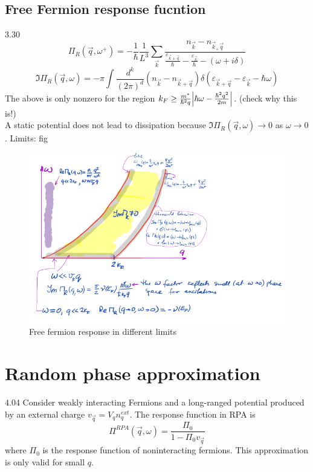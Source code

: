 \documentclass[10pt]{article}
\begin{document}
\subsection{Free Fermion response fucntion}
3.30
$$
\Pi_R(\vec q, \omega^+) = -\frac{1}{\hbar}\frac{1}{L^3}\sum_{\vec k}\frac{n_{\vec k}-n_{\vec k _+ \vec q}}{\frac{\varepsilon_{\vec k + \vec q}}{\hbar}-\frac{\varepsilon_{\vec k}}{\hbar}-(\omega + i\delta)}
$$
$$
\Im \Pi_R(\vec q, \omega) = -\pi \int \frac{d^k}{(2\pi)^d}(n_{\vec k}-n_{\vec k + \vec q})\delta(\varepsilon_{\vec k + \vec q} - \varepsilon_{\vec k}-\hbar \omega)
$$
The above is only nonzero for the region $k_F \geq \frac{m^\ast}{\hbar^2q}\qty|\hbar \omega - \frac{\hbar^2q^2}{2m}|$. (check why this is!)\\
A static potential does not lead to dissipation because $\Im \Pi_R(\vec q, \omega) \to 0$ as $\omega \to 0$.
Limits:
fig
\begin{figure}[ht]
    \centering
    \includegraphics[scale=.4]{./figures/fig.png}
    \caption{Free fermion response in different limits}
    \label{fig:fig}
\end{figure}

\section{Random phase approximation}
4.04
Consider weakly interacting Fermions and a long-ranged potential produced by an external charge $v_{\vec q} = V_q n_q^{ext}$. The response function in RPA is
$$
\Pi^{RPA}(\vec q, \omega) = \frac{\Pi_0}{1-\Pi_0v_{\vec q}}
$$
where $\Pi_0$ is the response function of noninteracting fermions. This approximation is only valid for small $q$. \\
\end{document}
